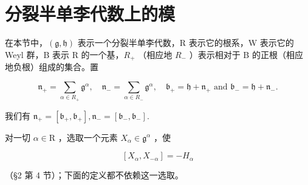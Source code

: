 \section{分裂半单李代数上的模}

在本节中，\((\mathfrak{g},\mathfrak{h})\) 表示一个分裂半单李代数，R 表示它的根系，W 表示它的 Weyl 群，B 表示 R 的一个基，\(R_{+}\) （相应地 \(R_{-}\) ）表示相对于 B 的正根（相应地负根）组成的集合。置

\[
\mathfrak {n} _ {+} = \sum_ {\alpha \in R _ {+}} \mathfrak {g} ^ {\alpha}, \quad \mathfrak {n} _ {-} = \sum_ {\alpha \in R _ {-}} \mathfrak {g} ^ {\alpha}, \quad \mathfrak {b} _ {+} = \mathfrak {h} + \mathfrak {n} _ {+} \text {   and   } \mathfrak {b} _ {-} = \mathfrak {h} + \mathfrak {n} _ {-}.
\]

我们有 \(\mathfrak{n}_{+} = [\mathfrak{b}_{+},\mathfrak{b}_{+}],\mathfrak{n}_{-} = [\mathfrak{b}_{-},\mathfrak{b}_{-}].\)

对一切 \(\alpha\in\mathrm{R}\) ，选取一个元素 \(X_{\alpha}\in\mathfrak{g}^{\alpha}\) ，使

\[
[ X _ {\alpha}, X _ {- \alpha} ] = - H _ {\alpha}
\]

（§2 第 4 节）；下面的定义都不依赖这一选取。

